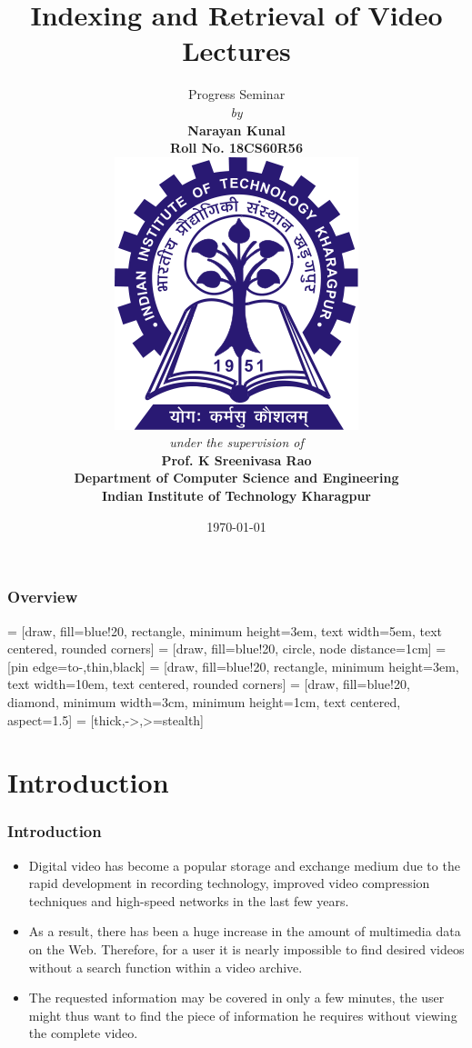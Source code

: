 \documentclass{beamer}
\title[Progress Seminar]{Indexing and Retrieval of Video Lectures}
\author[Narayan Kunal]{
{\footnotesize{Progress Seminar} \\ 
{\textit{by}} \\ 
\textbf{{Narayan Kunal} \\
{Roll No. 18CS60R56 }}\\ \vspace*{3mm}
\includegraphics[width=0.15\linewidth]{figures/iit_kgp_80} \\ \vspace*{3mm} %
{\textit{under the supervision of}}\\ \vspace*{2mm}
\textbf{{Prof. K Sreenivasa Rao }} \\ \vspace*{1mm}
{\bf{Department of Computer Science and Engineering\\ Indian Institute of Technology Kharagpur}}
}
}
\date{\today} %
\begin{document}
\begin{frame}
\titlepage %
\end{frame}

\begin{frame}
\frametitle{Overview} 
\tableofcontents 
\end{frame}

 = [draw, fill=blue!20, rectangle, 
    minimum height=3em, text width=5em, text centered, rounded corners]
 = [draw, fill=blue!20, circle, node distance=1cm]
	 = [pin edge={to-,thin,black}]
 = [draw, fill=blue!20, rectangle, 
    minimum height=3em, text width=10em, text centered, rounded corners]
 = [draw, fill=blue!20, diamond, 
    minimum width=3cm, minimum height=1cm, text centered, aspect=1.5]
 = [thick,->,>=stealth]



\section{Introduction} \label{Introduction}

\begin{frame}
\frametitle{Introduction}
\begin{itemize}
	
	\item Digital video has become a popular storage and exchange medium due to the rapid development in recording technology, improved video compression techniques and high-speed networks in the last few years. 
	
	\item As a result, there has been a huge increase in the amount of multimedia data on the Web. Therefore, for a user it is nearly impossible to find desired videos without a search function  within a video archive.
	
	\item The requested information may be covered in only a few minutes, the user might thus want to find the piece of information he requires without viewing the complete video.

\end{itemize}
\end{frame}
\end{document}
